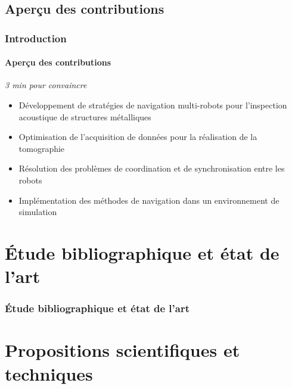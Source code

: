 \documentclass{beamer}
\begin{document}
		\subsection*{Aperçu des contributions}
			\begin{frame}
				\frametitle{Introduction}
				\framesubtitle{Aperçu des contributions}
				\vspace{-15pt}
				\begin{flushright}
					\textit{3 min pour convaincre}
				\end{flushright}
				\begin{itemize}
					\item Développement de stratégies de navigation multi-robots pour l'inspection acoustique de structures métalliques
					\item Optimisation de l'acquisition de données pour la réalisation de la tomographie
					\item Résolution des problèmes de coordination et de synchronisation entre les robots
					\item Implémentation des méthodes de navigation dans un environnement de simulation
				\end{itemize}
			\end{frame}
	\section{Étude bibliographique et état de l'art}
		\begin{frame}
			\frametitle{Étude bibliographique et état de l'art}
			\tiny
			\nocite{9811581, HUTHWAITE2013979, s22093235, article455556, 9568841, 7487624, 7139673}
			
			
		\end{frame}
	\section{Propositions scientifiques et techniques}
\end{document}
